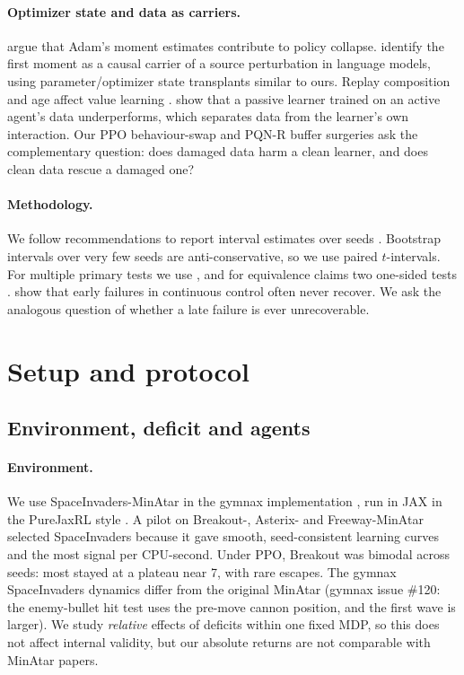 \documentclass[10pt]{article} %
\begin{document}
\paragraph{Optimizer state and data as carriers.}
\citet{dohare2023collapse} argue that Adam's moment estimates contribute to policy collapse. \citet{xu2026optimizer} identify the first moment as a causal carrier of a source perturbation in language models, using parameter/optimizer state transplants similar to ours. Replay composition and age affect value learning \citep{fedus2020replay}. \citet{ostrovski2021passive} show that a passive learner trained on an active agent's data underperforms, which separates data from the learner's own interaction. Our PPO behaviour-swap and PQN-R buffer surgeries ask the complementary question: does damaged data harm a clean learner, and does clean data rescue a damaged one?

\paragraph{Methodology.}
We follow recommendations to report interval estimates over seeds \citep{henderson2018matters,agarwal2021precipice}. Bootstrap intervals over very few seeds are anti-conservative, so we use paired $t$-intervals. For multiple primary tests we use \citet{holm1979simple}, and for equivalence claims two one-sided tests \citep[TOST;][]{lakens2017equivalence}. \citet{bjorck2022variance} show that early failures in continuous control often never recover. We ask the analogous question of whether a late failure is ever unrecoverable.

\section{Setup and protocol}\label{sec:protocol}

\subsection{Environment, deficit and agents}

\paragraph{Environment.}
We use SpaceInvaders-MinAtar \citep{young2019minatar} in the gymnax implementation \citep{lange2022gymnax}, run in JAX in the PureJaxRL style \citep{lu2022discovered}. A pilot on Breakout-, Asterix- and Freeway-MinAtar selected SpaceInvaders because it gave smooth, seed-consistent learning curves and the most signal per CPU-second. Under PPO, Breakout was bimodal across seeds: most stayed at a plateau near 7, with rare escapes. The gymnax SpaceInvaders dynamics differ from the original MinAtar (gymnax issue \#120: the enemy-bullet hit test uses the pre-move cannon position, and the first wave is larger). We study \emph{relative} effects of deficits within one fixed MDP, so this does not affect internal validity, but our absolute returns are not comparable with MinAtar papers.
\end{document}
